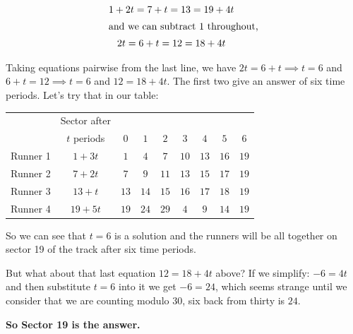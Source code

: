 {\begin{MySolutionBox}
\begin{gather*}
          1 + 2t = 7 + t = 13 = 19 + 4t\\
          \shortintertext{and we can subtract \(1\) throughout,}
          2t = 6 + t = 12 = 18 + 4t
       \end{gather*}\par
       Taking equations pairwise from the last line, we have \(2t = 6+t\implies t=6\) and \(6+t=12\implies t=6\) and \(12=18+4t\). The first two give an answer of six time periods. Let's try that in our table:
         \begin{tabular}{l|c|c|c|c|c|c|c|c}
          &Sector after& & & & & & &\\
          &\(t\) periods& \(0\) & \(1\) & \(2\) & \(3\) & \(4\) & \(5\) & \(6\)\\ \hline
           Runner 1 & \(1+3t\) & \(1\) & \(4\) & \(7\) & \(10\) & \(13\) & \(16\) & \(19\)\\
           Runner 2 & \(7+2t\) & \(7\) & \(9\) & \(11\) & \(13\) & \(15\) & \(17\) & \(19\)\\
           Runner 3 & \(13+t\) & \(13\) & \(14\) & \(15\) & \(16\) & \(17\) & \(18\) & \(19\)\\
           Runner 4 & \(19+5t\) & \(19\) & \(24\) & \(29\) & \(4\) & \(9\) & \(14\) & \(19\)\\
        \end{tabular}\par\vspace{4mm}
        So we can see that \(t=6\) is a solution and the runners will be all together on sector 19 of the track after six time periods.\par
        But what about that last equation \(12=18+4t\) above? If we simplify: \(-6=4t\) and then substitute \(t=6\) into it we get \(-6=24\), which seems strange until we consider that we are counting modulo \(30\), six back from thirty is \(24\).\par
        \textbf{So Sector 19 is the answer.}
    \end{MySolutionBox}
      }{}%




